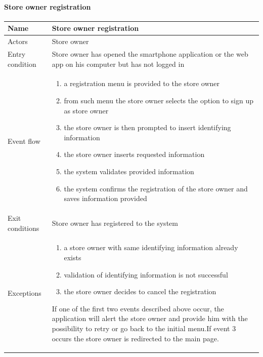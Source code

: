 \paragraph{Store owner registration}
\begin{flushleft}
	\begin{tabular} { | m{3cm} | m{10cm} | }
		\hline
		Name & Store owner registration\\
		\hline
		Actors & Store owner\\
		\hline
		Entry condition & Store owner has opened the smartphone application or the web app on his computer but has not logged in\\
		\hline
		Event flow & \begin{enumerate}
			\item a registration menu is provided to the store owner
			\item from such menu the store owner selects the option to sign up as store owner
			\item the store owner is then prompted to insert identifying information
			\item the store owner inserts requested information
			\item the system validates provided information
			\item the system confirms the registration of the store owner and saves information provided
		\end{enumerate}\\
		\hline
		Exit conditions & Store owner has registered to the system\\
		\hline
		Exceptions & \begin{enumerate}
			\item a store owner with same identifying information already exists
			\item validation of identifying information is not successful
			\item the store owner decides to cancel the registration
		\end{enumerate}
		If one of the first two events described above occur, the application will alert the store owner and provide him with the possibility to retry or go back to the initial menu.\newline If event 3 occurs the store owner is redirected to the main page.\\
		\hline
	\end{tabular}
\end{flushleft}

